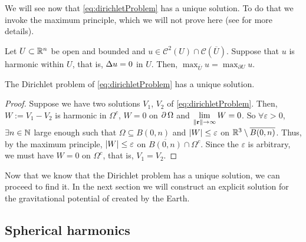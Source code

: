 \documentclass[../main.tex]{subfiles}
\begin{document}
We will see now that \cref{eq:dirichletProblem} has a unique solution. To do that we invoke the maximum principle, which we will not prove here (see \cite{evans} for more details).
\begin{theorem}
  Let $U\subset \mathbb{R}^n$ be open and bounded and $u\in\mathcal{C}^2(U)\cap \mathcal{C}(\overline{U})$. Suppose that $u$ is harmonic within $U$, that is, $\Delta u=0$ in $U$. Then, $\max_{\overline{U}}u=\max_{\partial U}u$.
\end{theorem}
\begin{corollary}
  The Dirichlet problem of \cref{eq:dirichletProblem} has a unique solution.
\end{corollary}
\begin{proof}
  Suppose we have two solutions $V_1$, $V_2$ of \cref{eq:dirichletProblem}. Then, $W:=V_1-V_2$ is harmonic in $\Omega^c$, $W=0$ on $\operatorname{\partial}{\Omega}$ and $\displaystyle\lim_{\left\|\boldsymbol{\mathrm{r}}\right\|\to\infty}W=0$. So $\forall\varepsilon>0$, $\exists n\in\mathbb{N}$ large enough such that $\Omega \subseteq B(0,n)$ and $\abs{W}\leq \varepsilon$ on $\mathbb{R}^3\setminus \overline{B(0,n)}$. Thus, by the maximum principle, $\abs{W}\leq \varepsilon$ on $\overline{B(0,n)}\cap \Omega^c$. Since the $\varepsilon$ is arbitrary, we must have $W=0$ on $\Omega^c$, that is, $V_1=V_2$.
\end{proof}
Now that we know that the Dirichlet problem has a unique solution, we can proceed to find it. In the next section we will construct an explicit solution for the gravitational potential of created by the Earth.
\subsection{Spherical harmonics}
\end{document}

